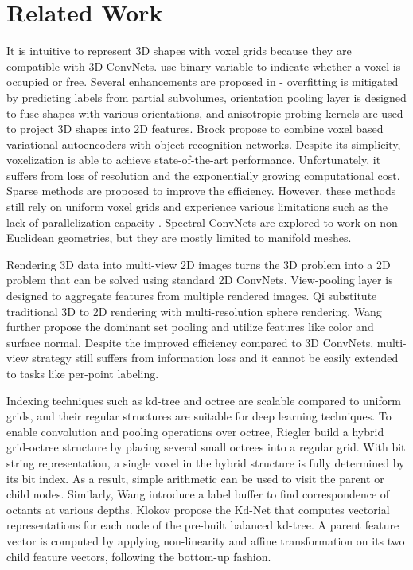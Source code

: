 \documentclass[10pt,twocolumn,letterpaper]{article}
\begin{document}
\section{Related Work}  \label{sec_related_work}
It is intuitive to represent 3D shapes with voxel grids because they are compatible with 3D ConvNets. \cite{maturana2015voxnet,wu20153d} use binary variable to indicate whether a voxel is occupied or free. Several enhancements are proposed in \cite{qi2016volumetric} - overfitting is mitigated by predicting labels from partial subvolumes, orientation pooling layer is designed to fuse shapes with various orientations, and anisotropic probing kernels are used to project 3D shapes into 2D features. Brock \etal \cite{brock2016generative} propose to combine voxel based variational autoencoders with object recognition networks. Despite its simplicity, voxelization is able to achieve state-of-the-art performance. Unfortunately, it suffers from loss of resolution and the exponentially growing computational cost. Sparse methods \cite{wang2015voting, li2016fpnn, engelcke2017vote3deep} are proposed to improve the efficiency. However, these methods still rely on uniform voxel grids and experience various limitations such as the lack of parallelization capacity \cite{li2016fpnn}. Spectral ConvNets \cite{masci2015geodesic,boscaini2015learning,bruna2013spectral} are explored to work on non-Euclidean geometries, but they are mostly limited to manifold meshes.

Rendering 3D data into multi-view 2D images turns the 3D problem into a 2D problem that can be solved using standard 2D ConvNets.
View-pooling layer \cite{su2015multi} is designed to aggregate features from multiple rendered images. Qi \etal \cite{qi2016volumetric} substitute traditional 3D to 2D rendering with multi-resolution sphere rendering. Wang \etal \cite{wang2017dominant} further propose the dominant set pooling and utilize features like color and surface normal. Despite the improved efficiency compared to 3D ConvNets, multi-view strategy still suffers from information loss \cite{klokov2017escape} and it cannot be easily extended to tasks like per-point labeling.

Indexing techniques such as kd-tree and octree are scalable compared to uniform grids, and their regular structures are suitable for deep learning techniques. To enable convolution and pooling operations over octree, Riegler \etal \cite{Riegler2017OctNet} build a hybrid grid-octree structure by placing several small octrees into a regular grid. With bit string representation, a single voxel in the hybrid structure is fully determined by its bit index. As a result, simple arithmetic can be used to visit the parent or child nodes. Similarly, Wang \etal \cite{wang2017cnn} introduce a label buffer to find correspondence of octants at various depths. Klokov \etal propose the Kd-Net \cite{klokov2017escape} that computes vectorial representations for each node of the pre-built balanced kd-tree. A parent feature vector is computed by applying non-linearity and affine transformation on its two child feature vectors, following the bottom-up fashion.
\end{document}
